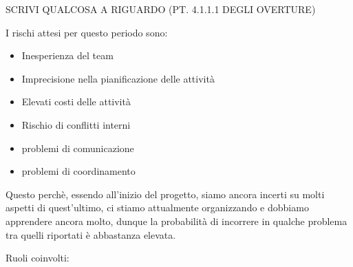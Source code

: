 SCRIVI QUALCOSA A RIGUARDO (PT. 4.1.1.1 DEGLI OVERTURE)

I rischi attesi per questo periodo sono:
\begin{itemize}
    \item Inesperienza del team
    \item Imprecisione nella pianificazione delle attività
    \item Elevati costi delle attività
    \item Rischio di conflitti interni 
    \item problemi di comunicazione
    \item problemi di coordinamento
\end{itemize}
Questo perchè, essendo all’inizio del progetto, siamo ancora incerti su molti aspetti di quest’ultimo, ci stiamo attualmente organizzando e dobbiamo apprendere ancora molto, dunque la probabilità di incorrere in qualche problema tra quelli riportati è abbastanza elevata.

Ruoli coinvolti:





